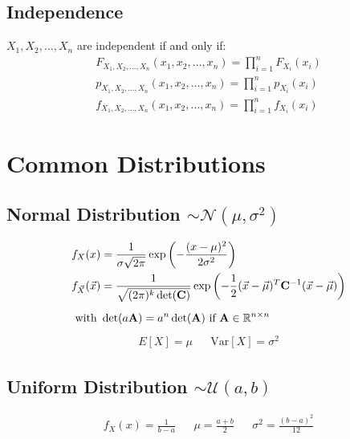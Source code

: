 \begin{mdframed}[style=eqbox]
  \subsection{Independence}
  $X_1, X_2, \ldots, X_n$ are independent if and only if:
  \vspace*{-6pt}
  \begin{align*}
    F_{X_1, X_2, \ldots, X_n}(x_1, x_2, \ldots, x_n) = \prod_{i=1}^{n} F_{X_i}(x_i)\\
    p_{X_1, X_2, \ldots, X_n}(x_1, x_2, \ldots, x_n) = \prod_{i=1}^{n} p_{X_i}(x_i)\\
    f_{X_1, X_2, \ldots, X_n}(x_1, x_2, \ldots, x_n) = \prod_{i=1}^{n} f_{X_i}(x_i)
  \end{align*}
\end{mdframed}

\section{Common Distributions}
\begin{mdframed}[style=eqbox]
  \subsection{Normal Distribution $\sim \mathcal{N}(\mu, \sigma^2)$}
  \vspace*{-6pt}
  \begin{align*}
    f_X(x) &= \frac{1}{\sigma \sqrt{2 \pi}} \exp\left(-\frac{(x-\mu)^2}{2 \sigma^2}\right)\\
    f_{\vec{X}}(\vec{x}) &= \frac{1}{\sqrt{(2 \pi)^k \det(\mathbf{C})}} \exp\left(-\frac{1}{2} (\vec{x}-\vec{\mu})^T \mathbf{C}^{-1} (\vec{x}-\vec{\mu})\right)\\[0.5em]
    \text{with~} &\det(a \mathbf{A}) = a^n \det(\mathbf{A}) \text{~if~} \mathbf{A} \in \mathbb{R}^{n \times n}
  \end{align*}
  \vspace*{-14pt}
  \begin{align*}
    E[X] = \mu && \text{Var}[X] = \sigma^2
  \end{align*}
\end{mdframed}

\begin{mdframed}[style=eqbox]
  \subsection{Uniform Distribution $\sim \mathcal{U}(a,b)$}
  \vspace*{-6pt}
  \begin{align*}
    f_X(x) = \frac{1}{b-a} && \mu = \frac{a+b}{2} && \sigma^2 = \frac{(b-a)^2}{12}
  \end{align*}
\end{mdframed}

